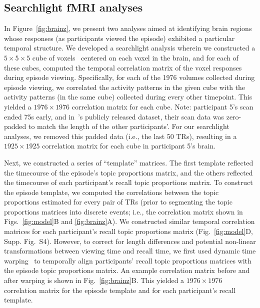 \documentclass[10pt]{article}
\newcommand{\corrmats}{S4}
\begin{document}
\subsection*{Searchlight fMRI analyses}
In Figure~\ref{fig:brainz}, we present two analyses aimed at identifying brain regions whose responses (as participants viewed the episode) exhibited a particular temporal structure.  We developed a searchlight analysis wherein we constructed a $5 \times 5 \times 5$ cube of voxels~\citep[following][]{ChenEtal17} centered on each voxel in the brain, and for each of these cubes, computed the temporal correlation matrix of the voxel responses during episode viewing.  Specifically, for each of the 1976 volumes collected during episode viewing, we correlated the activity patterns in the given cube with the activity patterns (in the same cube) collected during every other timepoint.  This yielded a $1976 \times 1976$ correlation matrix for each cube.  Note: participant 5's scan ended 75s early, and in~\cite{ChenEtal17}'s publicly released dataset, their scan data was zero-padded to match the length of the other participants'.  For our searchlight analyses, we removed this padded data (i.e., the last 50 TRs), resulting in a $1925 \times 1925$ correlation matrix for each cube in participant 5's brain.

Next, we constructed a series of ``template'' matrices.  The first template reflected the timecourse of the episode's topic proportions matrix, and the others reflected the timecourse of each participant's recall topic proportions matrix.  To construct the episode template, we computed the correlations between the topic proportions estimated for every pair of TRs (prior to segmenting the topic proportions matrices into discrete events; i.e., the correlation matrix shown in Figs.~\ref{fig:model}B and \ref{fig:brainz}A).  We constructed similar temporal correlation matrices for each participant's recall topic proportions matrix (Fig.~\ref{fig:model}D, Supp. Fig.~\corrmats).  However, to correct for length differences and potential non-linear transformations between viewing time and recall time, we first used dynamic time warping~\citep{BernClif94} to temporally align participants' recall topic proportions matrices with the episode topic proportions matrix.  An example correlation matrix before and after warping is shown in Fig.~\ref{fig:brainz}B.  This yielded a $1976 \times 1976$ correlation matrix for the episode template and for each participant's recall template.
\end{document}
